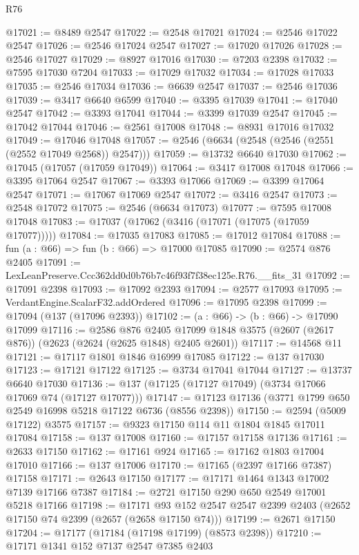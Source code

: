 \begin{lexlean}{R76}
\begin{coremodule}
@17021 := @8489 @2547
@17022 := @2548 @17021
@17024 := @2546 @17022 @2547
@17026 := @2546 @17024 @2547
@17027 := @17020 @17026
@17028 := @2546 @17027
@17029 := @8927 @17016
@17030 := @7203 @2398
@17032 := @7595 @17030 @7204
@17033 := @17029 @17032
@17034 := @17028 @17033
@17035 := @2546 @17034
@17036 := @6639 @2547
@17037 := @2546 @17036
@17039 := @3417 @6640 @6599
@17040 := @3395 @17039
@17041 := @17040 @2547
@17042 := @3393 @17041
@17044 := @3399 @17039 @2547
@17045 := @17042 @17044
@17046 := @2561 @17008
@17048 := @8931 @17016 @17032
@17049 := @17046 @17048
@17057 := @2546 (@6634 (@2548 (@2546 (@2551 (@2552 @17049 @2568)) @2547)))
@17059 := @13732 @6640 @17030
@17062 := @17045 (@17057 (@17059 @17049))
@17064 := @3417 @17008 @17048
@17066 := @3395 @17064 @2547
@17067 := @3393 @17066
@17069 := @3399 @17064 @2547
@17071 := @17067 @17069 @2547
@17072 := @3416 @2547
@17073 := @2548 @17072
@17075 := @2546 (@6634 @17073)
@17077 := @7595 @17008 @17048
@17083 := @17037 (@17062 (@3416 (@17071 (@17075 (@17059 @17077)))))
@17084 := @17035 @17083
@17085 := @17012 @17084
@17088 := fun (a : @66) => fun (b : @66) => @17000 @17085
@17090 := @2574 @876 @2405
@17091 := LexLeanPreserve.Ccc362dd0d0b76b7c46f93f7f38ec125e.R76.__fits_31
@17092 := @17091 @2398
@17093 := @17092 @2393
@17094 := @2577 @17093
@17095 := VerdantEngine.ScalarF32.addOrdered
@17096 := @17095 @2398
@17099 := @17094 (@137 (@17096 @2393))
@17102 := (a : @66) -> (b : @66) -> @17090 @17099
@17116 := @2586
    @876
    @2405
    @17099
    @1848
    @3575
    (@2607 (@2617 @876))
    (@2623 (@2624 (@2625 @1848) @2405 @2601))
@17117 := @14568 @11
@17121 := @17117 @1801 @1846 @16999 @17085
@17122 := @137 @17030
@17123 := @17121 @17122
@17125 := @3734 @17041 @17044
@17127 := @13737 @6640 @17030
@17136 := @137 (@17125 (@17127 @17049) (@3734 @17066 @17069 @74 (@17127 @17077)))
@17147 := @17123 @17136 (@3771 @1799 @650 @2549 @16998 @5218 @17122 @6736 (@8556 @2398))
@17150 := @2594 (@5009 @17122) @3575
@17157 := @9323 @17150 @114 @11 @1804 @1845 @17011 @17084
@17158 := @137 @17008
@17160 := @17157 @17158 @17136
@17161 := @2633 @17150
@17162 := @17161 @924
@17165 := @17162 @1803 @17004 @17010
@17166 := @137 @17006
@17170 := @17165 (@2397 @17166 @7387) @17158
@17171 := @2643 @17150
@17177 := @17171 @1464 @1343 @17002 @7139 @17166 @7387
@17184 := @2721 @17150 @290 @650 @2549 @17001 @5218 @17166
@17198 := @17171
    @93
    @152
    @2547
    @2547
    @2399
    @2403
    (@2652 @17150 @74 @2399 (@2657 (@2658 @17150 @74)))
@17199 := @2671 @17150
@17204 := @17177 (@17184 (@17198 @17199) (@8573 @2398))
@17210 := @17171 @1341 @152 @7137 @2547 @7385 @2403

\end{coremodule}
\end{lexlean}
